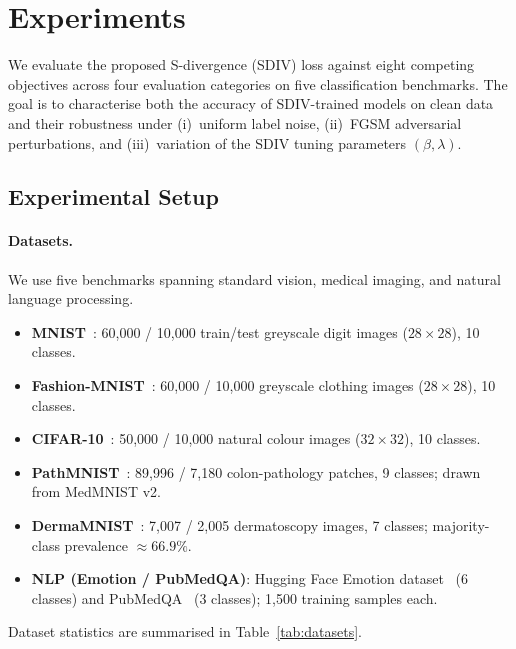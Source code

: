 
\section{Experiments}
\label{sec:experiments}

We evaluate the proposed S-divergence (SDIV) loss against eight competing
objectives across four evaluation categories on five classification benchmarks.
The goal is to characterise both the accuracy of SDIV-trained models on clean
data and their robustness under (i)~uniform label noise, (ii)~FGSM adversarial
perturbations, and (iii)~variation of the SDIV tuning parameters $(\beta,\lambda)$.

\subsection{Experimental Setup}
\label{sec:setup}

\paragraph{Datasets.}
We use five benchmarks spanning standard vision, medical imaging, and natural
language processing.
\begin{itemize}[leftmargin=*,itemsep=2pt]
  \item \textbf{MNIST}~\citep{lecun1998}: 60{,}000 / 10{,}000 train/test
        greyscale digit images ($28{\times}28$), 10 classes.
  \item \textbf{Fashion-MNIST}~\citep{xiao2017fashion}: 60{,}000 / 10{,}000
        greyscale clothing images ($28{\times}28$), 10 classes.
  \item \textbf{CIFAR-10}~\citep{krizhevsky2009}: 50{,}000 / 10{,}000
        natural colour images ($32{\times}32$), 10 classes.
  \item \textbf{PathMNIST}~\citep{yang2023medmnist}: 89{,}996 / 7{,}180
        colon-pathology patches, 9 classes; drawn from MedMNIST v2.
  \item \textbf{DermaMNIST}~\citep{yang2023medmnist}: 7{,}007 / 2{,}005
        dermatoscopy images, 7 classes; majority-class prevalence $\approx66.9\%$.
  \item \textbf{NLP (Emotion / PubMedQA)}: Hugging Face Emotion
        dataset~\citep{saravia2018} (6 classes) and PubMedQA~\citep{jin2019}
        (3 classes); 1{,}500 training samples each.
\end{itemize}
Dataset statistics are summarised in Table~\ref{tab:datasets}.

